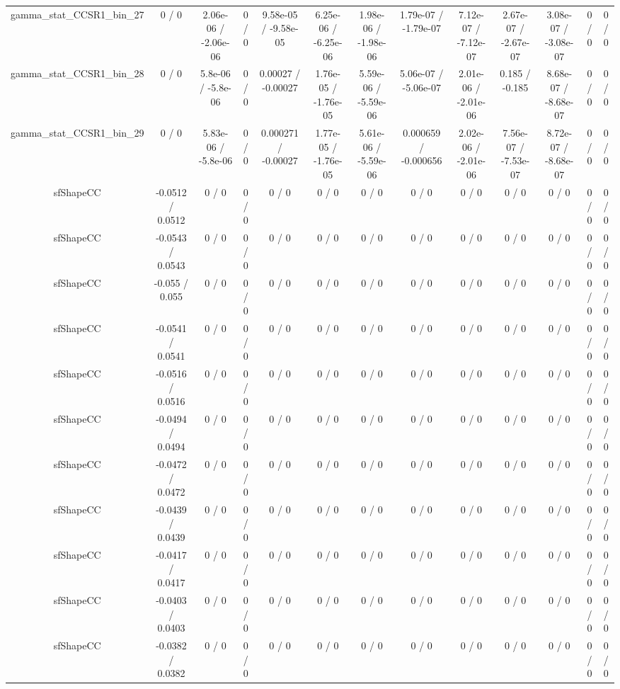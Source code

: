 \documentclass[10pt]{article}
\begin{document}
\begin{table}[htbp]
\begin{center}
\begin{tabular}{|c|c|c|c|c|c|c|c|c|c|c|c|c|}
  gamma_stat_CCSR1_bin_27 & 0 / 0 & 2.06e-06 / -2.06e-06 & 0 / 0 & 9.58e-05 / -9.58e-05 & 6.25e-06 / -6.25e-06 & 1.98e-06 / -1.98e-06 & 1.79e-07 / -1.79e-07 & 7.12e-07 / -7.12e-07 & 2.67e-07 / -2.67e-07 & 3.08e-07 / -3.08e-07 & 0 / 0 & 0 / 0 \\ 
  gamma_stat_CCSR1_bin_28 & 0 / 0 & 5.8e-06 / -5.8e-06 & 0 / 0 & 0.00027 / -0.00027 & 1.76e-05 / -1.76e-05 & 5.59e-06 / -5.59e-06 & 5.06e-07 / -5.06e-07 & 2.01e-06 / -2.01e-06 & 0.185 / -0.185 & 8.68e-07 / -8.68e-07 & 0 / 0 & 0 / 0 \\ 
  gamma_stat_CCSR1_bin_29 & 0 / 0 & 5.83e-06 / -5.8e-06 & 0 / 0 & 0.000271 / -0.00027 & 1.77e-05 / -1.76e-05 & 5.61e-06 / -5.59e-06 & 0.000659 / -0.000656 & 2.02e-06 / -2.01e-06 & 7.56e-07 / -7.53e-07 & 8.72e-07 / -8.68e-07 & 0 / 0 & 0 / 0 \\ 
  sfShapeCC & -0.0512 / 0.0512 & 0 / 0 & 0 / 0 & 0 / 0 & 0 / 0 & 0 / 0 & 0 / 0 & 0 / 0 & 0 / 0 & 0 / 0 & 0 / 0 & 0 / 0 \\ 
  sfShapeCC & -0.0543 / 0.0543 & 0 / 0 & 0 / 0 & 0 / 0 & 0 / 0 & 0 / 0 & 0 / 0 & 0 / 0 & 0 / 0 & 0 / 0 & 0 / 0 & 0 / 0 \\ 
  sfShapeCC & -0.055 / 0.055 & 0 / 0 & 0 / 0 & 0 / 0 & 0 / 0 & 0 / 0 & 0 / 0 & 0 / 0 & 0 / 0 & 0 / 0 & 0 / 0 & 0 / 0 \\ 
  sfShapeCC & -0.0541 / 0.0541 & 0 / 0 & 0 / 0 & 0 / 0 & 0 / 0 & 0 / 0 & 0 / 0 & 0 / 0 & 0 / 0 & 0 / 0 & 0 / 0 & 0 / 0 \\ 
  sfShapeCC & -0.0516 / 0.0516 & 0 / 0 & 0 / 0 & 0 / 0 & 0 / 0 & 0 / 0 & 0 / 0 & 0 / 0 & 0 / 0 & 0 / 0 & 0 / 0 & 0 / 0 \\ 
  sfShapeCC & -0.0494 / 0.0494 & 0 / 0 & 0 / 0 & 0 / 0 & 0 / 0 & 0 / 0 & 0 / 0 & 0 / 0 & 0 / 0 & 0 / 0 & 0 / 0 & 0 / 0 \\ 
  sfShapeCC & -0.0472 / 0.0472 & 0 / 0 & 0 / 0 & 0 / 0 & 0 / 0 & 0 / 0 & 0 / 0 & 0 / 0 & 0 / 0 & 0 / 0 & 0 / 0 & 0 / 0 \\ 
  sfShapeCC & -0.0439 / 0.0439 & 0 / 0 & 0 / 0 & 0 / 0 & 0 / 0 & 0 / 0 & 0 / 0 & 0 / 0 & 0 / 0 & 0 / 0 & 0 / 0 & 0 / 0 \\ 
  sfShapeCC & -0.0417 / 0.0417 & 0 / 0 & 0 / 0 & 0 / 0 & 0 / 0 & 0 / 0 & 0 / 0 & 0 / 0 & 0 / 0 & 0 / 0 & 0 / 0 & 0 / 0 \\ 
  sfShapeCC & -0.0403 / 0.0403 & 0 / 0 & 0 / 0 & 0 / 0 & 0 / 0 & 0 / 0 & 0 / 0 & 0 / 0 & 0 / 0 & 0 / 0 & 0 / 0 & 0 / 0 \\ 
  sfShapeCC & -0.0382 / 0.0382 & 0 / 0 & 0 / 0 & 0 / 0 & 0 / 0 & 0 / 0 & 0 / 0 & 0 / 0 & 0 / 0 & 0 / 0 & 0 / 0 & 0 / 0 \\ 

\end{tabular}
\end{center}
\end{table}
\end{document}
